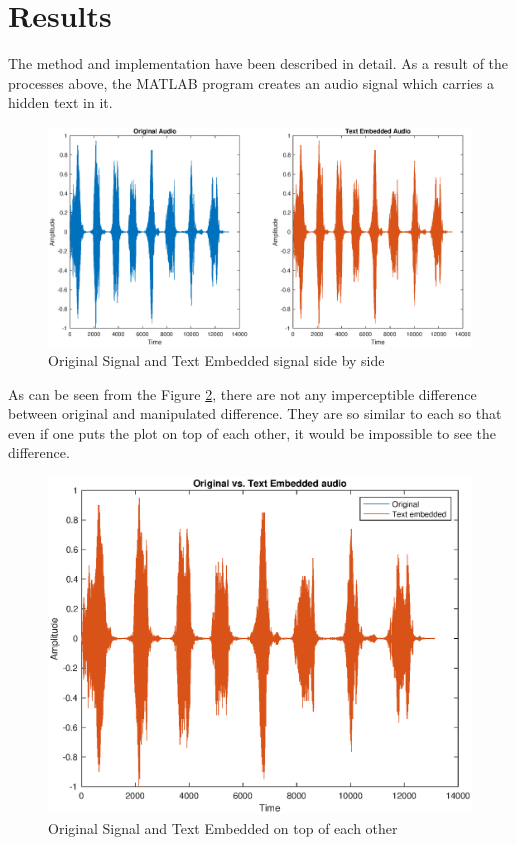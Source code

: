 \documentclass[twocolumns]{IEEEtran}
\begin{document}
	\section{Results}
	
	The method and implementation have been described in detail. As a result of the processes above, the MATLAB program creates an audio signal which carries a hidden text in it.
	\begin{figure}[h]
		\centering
		\includegraphics[scale=.32]{orig_vs_hidden.eps}
		\caption{Original Signal and Text Embedded signal side by side}
		\label{fig:versus}
	\end{figure}
	As can be seen from the Figure \ref{fig:versus}, there are not any imperceptible difference between original and manipulated difference. They are so similar to each so that even if one puts the plot on top of each other, it would be impossible to see the difference.
		\begin{figure}[h]
		\centering
		\includegraphics[scale=.5]{combined.eps}
		\caption{Original Signal and Text Embedded on top of each other}
		\label{fig:versus}
	\end{figure}
\end{document}
